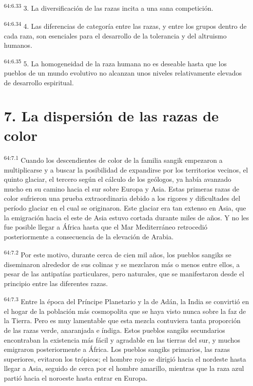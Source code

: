 \par
\textsuperscript{64:6.33} 3. La diversificación de las razas incita a una sana competición.

\par
\textsuperscript{64:6.34} 4. Las diferencias de categoría entre las razas, y entre los grupos dentro de cada raza, son esenciales para el desarrollo de la tolerancia y del altruismo humanos.

\par
\textsuperscript{64:6.35} 5. La homogeneidad de la raza humana no es deseable hasta que los pueblos de un mundo evolutivo no alcanzan unos niveles relativamente elevados de desarrollo espiritual.

\section*{7. La dispersión de las razas de color}
\par
\textsuperscript{64:7.1} Cuando los descendientes de color de la familia sangik empezaron a multiplicarse y a buscar la posibilidad de expandirse por los territorios vecinos, el quinto glaciar, el tercero según el cálculo de los geólogos, ya había avanzado mucho en su camino hacia el sur sobre Europa y Asia. Estas primeras razas de color sufrieron una prueba extraordinaria debido a los rigores y dificultades del período glaciar en el cual se originaron. Este glaciar era tan extenso en Asia, que la emigración hacia el este de Asia estuvo cortada durante miles de años. Y no les fue posible llegar a África hasta que el Mar Mediterráneo retrocedió posteriormente a consecuencia de la elevación de Arabia.

\par
\textsuperscript{64:7.2} Por este motivo, durante cerca de cien mil años, los pueblos sangiks se diseminaron alrededor de sus colinas y se mezclaron más o menos entre ellos, a pesar de las antipatías particulares, pero naturales, que se manifestaron desde el principio entre las diferentes razas.

\par
\textsuperscript{64:7.3} Entre la época del Príncipe Planetario y la de Adán, la India se convirtió en el hogar de la población más cosmopolita que se haya visto nunca sobre la faz de la Tierra. Pero es muy lamentable que esta mezcla contuviera tanta proporción de las razas verde, anaranjada e índiga. Estos pueblos sangiks secundarios encontraban la existencia más fácil y agradable en las tierras del sur, y muchos emigraron posteriormente a África. Los pueblos sangiks primarios, las razas superiores, evitaron los trópicos; el hombre rojo se dirigió hacia el nordeste hasta llegar a Asia, seguido de cerca por el hombre amarillo, mientras que la raza azul partió hacia el noroeste hasta entrar en Europa.

